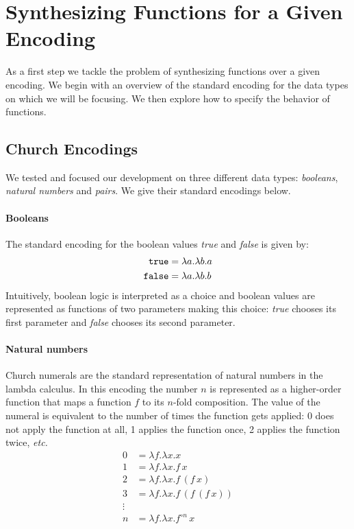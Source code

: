 \section{Synthesizing Functions for a Given Encoding}
%
As a first step we tackle the problem of synthesizing
functions over a given encoding.
%
We begin with an overview of the standard encoding for the
data types on which we will be focusing.
%
We then explore how to specify the behavior of functions.


\subsection{Church Encodings}
%
We tested and focused our development on three
different data types: \emph{booleans}, \emph{natural
numbers} and \emph{pairs}.
%
We give their standard encodings below.

\paragraph{Booleans}
%
The standard encoding for the boolean values \emph{true} and
\emph{false} is given by:
%
\begin{align*}
  \text{\texttt{true}} &= \lambda a . \lambda b . a \\
  \text{\texttt{false}} &= \lambda a . \lambda b . b
\end{align*}
%
Intuitively, boolean logic is interpreted as a choice and
boolean values are represented as functions of two
parameters making this choice: \emph{true} chooses its first
parameter and \emph{false} chooses its second parameter.

\paragraph{Natural numbers}
%
Church numerals are the standard representation of natural
numbers in the lambda calculus.
%
In this encoding the number $n$ is represented as a
higher-order function that maps a function $f$ to its
$n$-fold composition.
%
The value of the numeral is equivalent to the number of
times the function gets applied: 0 does not apply the
function at all, 1 applies the function once, 2 applies the
function twice, \emph{etc.}
%
\begin{align*}
  0 & = \lambda f . \lambda x . x \\
  1 & = \lambda f . \lambda x . f\,x \\
  2 & = \lambda f . \lambda x . f\,(f\,x) \\
  3 & = \lambda f . \lambda x . f\,(f\,(f\,x)) \\
  \vdots & \\
  n & = \lambda f . \lambda x . f^{\circ n}\,x
\end{align*}

